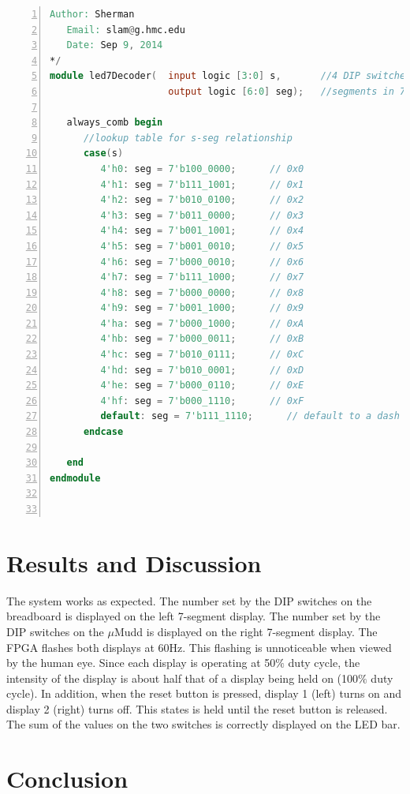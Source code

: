 \documentclass[11pt]{article}
\begin{document}
\begin{lstlisting}[language=Verilog,numbers=left,basicstyle=\footnotesize]
   Author: Sherman
   Email: slam@g.hmc.edu
   Date: Sep 9, 2014
*/
module led7Decoder(  input logic [3:0] s,       //4 DIP switches
                     output logic [6:0] seg);   //segments in 7-seg display
                     
   always_comb begin
      //lookup table for s-seg relationship
      case(s)
         4'h0: seg = 7'b100_0000;      // 0x0
         4'h1: seg = 7'b111_1001;      // 0x1
         4'h2: seg = 7'b010_0100;      // 0x2
         4'h3: seg = 7'b011_0000;      // 0x3
         4'h4: seg = 7'b001_1001;      // 0x4
         4'h5: seg = 7'b001_0010;      // 0x5
         4'h6: seg = 7'b000_0010;      // 0x6
         4'h7: seg = 7'b111_1000;      // 0x7
         4'h8: seg = 7'b000_0000;      // 0x8
         4'h9: seg = 7'b001_1000;      // 0x9
         4'ha: seg = 7'b000_1000;      // 0xA
         4'hb: seg = 7'b000_0011;      // 0xB
         4'hc: seg = 7'b010_0111;      // 0xC
         4'hd: seg = 7'b010_0001;      // 0xD
         4'he: seg = 7'b000_0110;      // 0xE
         4'hf: seg = 7'b000_1110;      // 0xF
         default: seg = 7'b111_1110;      // default to a dash
      endcase
      
   end
endmodule



\end{lstlisting}


\clearpage

\section{Results and Discussion}

The system works as expected. The number set by the DIP switches on the breadboard is displayed on the left 7-segment display. The number set by the DIP switches on the $\mu$Mudd is displayed on the right 7-segment display. The FPGA flashes both displays at 60Hz. This flashing is unnoticeable when viewed by the human eye. Since each display is operating at 50$\%$ duty cycle, the intensity of the display is about half that of a display being held on (100$\%$ duty cycle). In addition, when the reset button is pressed, display 1 (left) turns on and display 2 (right) turns off. This states is held until the reset button is released. The sum of the values on the two switches is correctly displayed on the LED bar. \\


\section{Conclusion}
\end{document}
